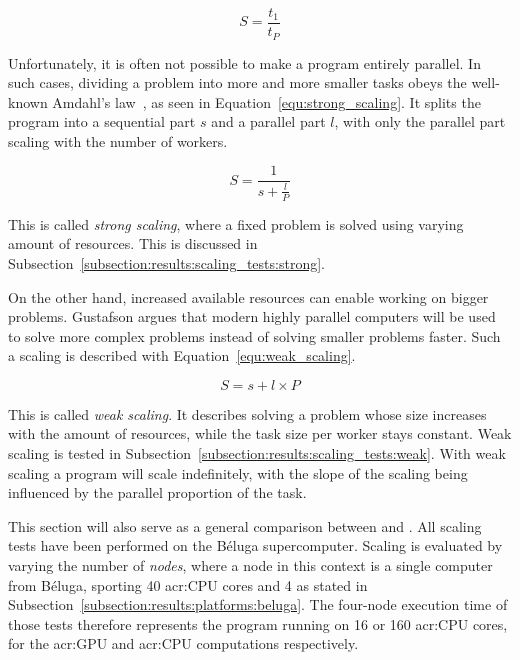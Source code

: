 \begin{equation} \label{equ:scaling}
	S = \frac{t_1}{t_P}
\end{equation}

Unfortunately, it is often not possible to make a program entirely parallel. In such cases, dividing
a problem into more and more smaller tasks obeys the well-known Amdahl's law~\cite{Amdahl1967}, as
seen in Equation~\ref{equ:strong_scaling}. It splits the program into a sequential part \(s\) and a
parallel part \(l\), with only the parallel part scaling with the number of workers.

\begin{equation} \label{equ:strong_scaling}
	S = \frac{1}{s + \frac{l}{P}}
\end{equation}

This is called \textit{strong scaling}, where a fixed problem is solved using varying amount of
resources. This is discussed in Subsection~\ref{subsection:results:scaling_tests:strong}.

On the other hand, increased available resources can enable working on bigger problems. Gustafson
argues that modern highly parallel computers will be used to solve more complex problems instead of
solving smaller problems faster. Such a scaling is described with Equation~\ref{equ:weak_scaling}.

\begin{equation} \label{equ:weak_scaling}
	S = s + l \times P
\end{equation}

This is called \textit{weak scaling}. It describes solving a problem whose size increases with the
amount of resources, while the task size per worker stays constant. Weak scaling is tested in
Subsection~\ref{subsection:results:scaling_tests:weak}. With weak scaling a program will scale
indefinitely, with the slope of the scaling being influenced by the parallel proportion of the task.

This section will also serve as a general comparison between  and
. All scaling tests have been performed on the Béluga supercomputer. Scaling is
evaluated by varying the number of \textit{nodes}, where a node in this context is a single computer
from Béluga, sporting 40 \acrshort{acr:CPU} cores and 4  as stated in
Subsection~\ref{subsection:results:platforms:beluga}. The four-node execution time of those tests
therefore represents the program running on 16  or 160 \acrshort{acr:CPU} cores,
for the \acrshort{acr:GPU} and \acrshort{acr:CPU} computations respectively.

